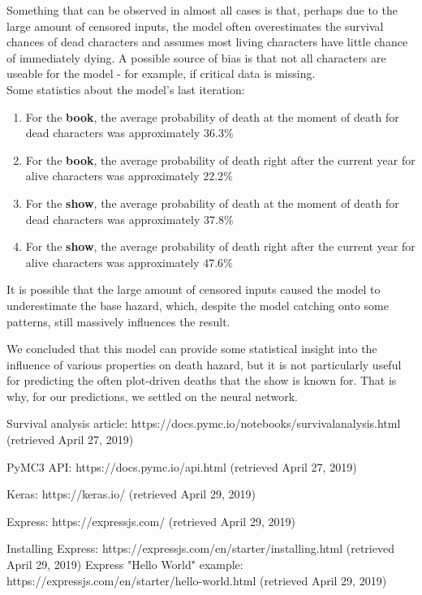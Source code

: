 \documentclass{bioinfo}
\begin{document}
Something that can be observed in almost all cases is that, perhaps due to the large amount of censored inputs, the model often overestimates the survival chances of dead characters and assumes most living characters have little chance of immediately dying. A possible source of bias is that not all characters are useable for the model - for example, if critical data is missing.\\
Some statistics about the model's last iteration:
\begin{enumerate}
    \item For the \textbf{book}, the average probability of death at the moment of death for dead characters was approximately $36.3\%$
    \item For the \textbf{book}, the average probability of death right after the current year for alive characters was approximately $22.2\%$
    \item For the \textbf{show}, the average probability of death at the moment of death for dead characters was approximately $37.8\%$
    \item For the \textbf{show}, the average probability of death right after the current year for alive characters was approximately $47.6\%$
\end{enumerate}
It is possible that the large amount of censored inputs caused the model to underestimate the base hazard, which, despite the model catching onto some patterns, still massively influences the result.

We concluded that this model can provide some statistical insight into the influence of various properties on death hazard, but it is not particularly useful for predicting the often plot-driven deaths that the show is known for. That is why, for our predictions, we settled on the neural network.




%
%
%
%
%
%
%
%
%


\begin{thebibliography}{}

  Survival analysis article: https://docs.pymc.io/notebooks/survival{\textunderscore}analysis.html (retrieved April 27, 2019)

 PyMC3 API: https://docs.pymc.io/api.html (retrieved April 27, 2019)

 Keras: https://keras.io/ (retrieved April 29, 2019)

 Express: https://expressjs.com/ (retrieved April 29, 2019)

 Installing Express: https://expressjs.com/en/starter/installing.html (retrieved April 29, 2019)
 Express "Hello World" example: https://expressjs.com/en/starter/hello-world.html (retrieved April 29, 2019)

\end{thebibliography}
\end{document}
